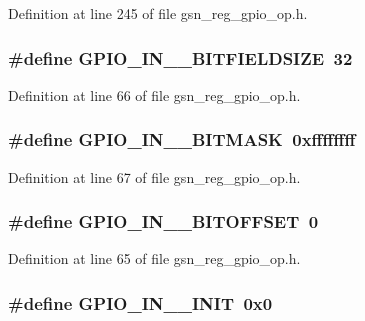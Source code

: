 Definition at line 245 of file gsn\_\-reg\_\-gpio\_\-op.h.

\hypertarget{a00553_ab3403b14825d6b6c14a0caaf09107a77}{
\subsubsection[{GPIO\_\-IN\_\-0\_\-BITFIELDSIZE}]{\setlength{\rightskip}{0pt plus 5cm}\#define GPIO\_\-IN\_\_\-BITFIELDSIZE~32}}
\label{a00553_ab3403b14825d6b6c14a0caaf09107a77}


Definition at line 66 of file gsn\_\-reg\_\-gpio\_\-op.h.

\hypertarget{a00553_ad42b97492e9210fb1c26f27ededbc2aa}{
\subsubsection[{GPIO\_\-IN\_\-0\_\-BITMASK}]{\setlength{\rightskip}{0pt plus 5cm}\#define GPIO\_\-IN\_\_\-BITMASK~0xffffffff}}
\label{a00553_ad42b97492e9210fb1c26f27ededbc2aa}


Definition at line 67 of file gsn\_\-reg\_\-gpio\_\-op.h.

\hypertarget{a00553_afd67af3297bbf6800de85cfcae170347}{
\subsubsection[{GPIO\_\-IN\_\-0\_\-BITOFFSET}]{\setlength{\rightskip}{0pt plus 5cm}\#define GPIO\_\-IN\_\_\-BITOFFSET~0}}
\label{a00553_afd67af3297bbf6800de85cfcae170347}


Definition at line 65 of file gsn\_\-reg\_\-gpio\_\-op.h.

\hypertarget{a00553_aaec9c64dc9aea77a67388f30149fbde3}{
\subsubsection[{GPIO\_\-IN\_\-0\_\-INIT}]{\setlength{\rightskip}{0pt plus 5cm}\#define GPIO\_\-IN\_\_\-INIT~0x0}}
\label{a00553_aaec9c64dc9aea77a67388f30149fbde3}


